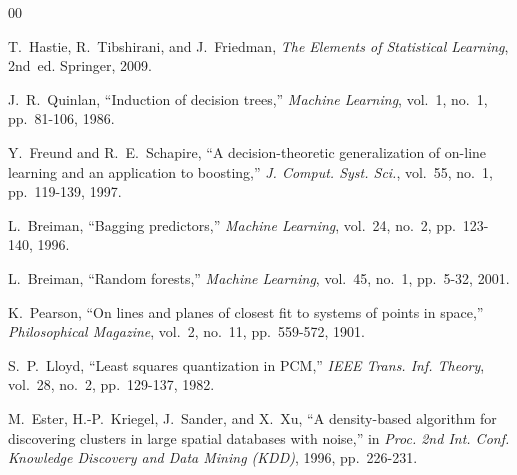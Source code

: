 \documentclass[conference]{IEEEtran}
\begin{document}
\begin{thebibliography}{00}

T.~Hastie, R.~Tibshirani, and J.~Friedman,
\textit{The Elements of Statistical Learning}, 2nd~ed.
Springer, 2009.

J.~R.~Quinlan,
``Induction of decision trees,''
\textit{Machine Learning}, vol.~1, no.~1, pp.~81-106, 1986.

Y.~Freund and R.~E.~Schapire,
``A decision-theoretic generalization of on-line learning and an
application to boosting,''
\textit{J. Comput. Syst. Sci.}, vol.~55, no.~1, pp.~119-139, 1997.

L.~Breiman,
``Bagging predictors,''
\textit{Machine Learning}, vol.~24, no.~2, pp.~123-140, 1996.

L.~Breiman,
``Random forests,''
\textit{Machine Learning}, vol.~45, no.~1, pp.~5-32, 2001.

K.~Pearson,
``On lines and planes of closest fit to systems of points in space,''
\textit{Philosophical Magazine}, vol.~2, no.~11, pp.~559-572, 1901.

S.~P.~Lloyd,
``Least squares quantization in PCM,''
\textit{IEEE Trans. Inf. Theory}, vol.~28, no.~2, pp.~129-137, 1982.

M.~Ester, H.-P.~Kriegel, J.~Sander, and X.~Xu,
``A density-based algorithm for discovering clusters in large spatial
databases with noise,''
in \textit{Proc. 2nd Int. Conf. Knowledge Discovery and Data Mining
(KDD)}, 1996, pp.~226-231.

\end{thebibliography}
\end{document}
